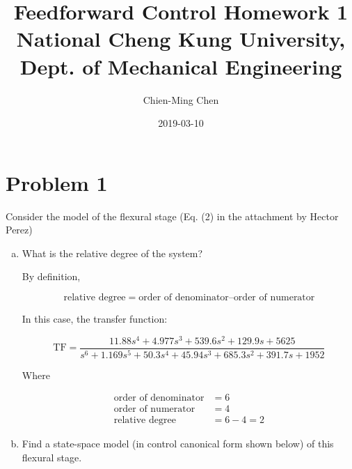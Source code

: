 \documentclass[12pt]{article}
\title{Feedforward Control Homework 1 \\
  \large National Cheng Kung University, Dept. of Mechanical Engineering}
\date{2019-03-10}
\author{Chien-Ming Chen}
\begin{document}
  \maketitle

  \section{Problem 1}
  Consider the model of the flexural stage (Eq. (2) in the attachment by Hector Perez)

  \begin{enumerate}[(a)]
    \item What is the relative degree of the system?

    By definition,

    \begin{equation}
      \text{relative degree} = \text{order of denominator} – \text{order of numerator}
    \end{equation}

    In this case, the transfer function:

    \begin{equation}
      \text{TF} = \frac{11.88 s^4 + 4.977 s^3 + 539.6 s^2 + 129.9 s + 5625}{s^6 + 1.169 s^5 + 50.3 s^4 + 45.94 s^3 + 685.3 s^2 + 391.7 s + 1952}
    \end{equation}

    Where

    \begin{align*}
      \text{order of denominator} &= 6 \\
      \text{order of numerator} &= 4 \\
      \text{relative degree} &= 6 - 4 = 2
    \end{align*}

    \clearpage

    \item Find a state-space model (in control canonical form shown below) of this flexural stage.


\end{enumerate}
\end{document}
